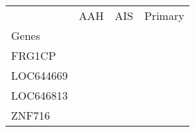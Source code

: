 \begin{tabular}{lccc}
\toprule
{} & AAH & AIS & Primary \\
Genes     &     &     &         \\
\midrule
FRG1CP    &     &     &         \\
LOC644669 &     &     &         \\
LOC646813 &     &     &         \\
ZNF716    &     &     &         \\
\bottomrule
\end{tabular}

